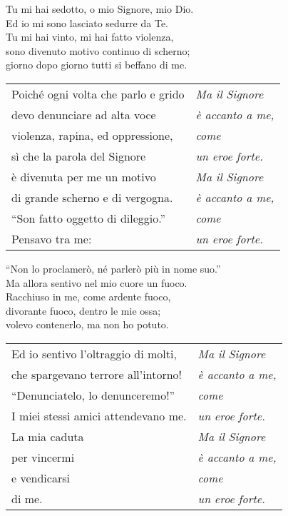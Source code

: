 
Tu mi hai sedotto, o mio Signore, mio Dio.\\
Ed io mi sono lasciato sedurre da Te.\\
Tu mi hai vinto, mi hai fatto violenza,\\
sono divenuto motivo continuo di scherno;\\
giorno dopo giorno tutti si beffano di me.

\spazio

\begin{tabular}{@{} p{6.25cm} p{4.25cm}}
  Poiché ogni volta che parlo e grido & \emph{Ma il Signore}\\
  devo denunciare ad alta voce & \emph{è accanto a me,} \\
  violenza, rapina, ed oppressione, & \emph{come} \\
  sì che la parola del Signore & \emph{un eroe forte.} \\
  è divenuta per me un motivo & \emph{Ma il Signore} \\
  di grande scherno e di vergogna. & \emph{è accanto a me,} \\
  ``Son fatto oggetto di dileggio.'' & \emph{come} \\
  Pensavo tra me: & \emph{un eroe forte.}
\end{tabular}

\spazio

``Non lo proclamerò, né parlerò più in nome suo.''\\
Ma allora sentivo nel mio cuore un fuoco.\\
Racchiuso in me, come ardente fuoco,\\
divorante fuoco, dentro le mie ossa;\\
volevo contenerlo, ma non ho potuto.

\spazio

\begin{tabular}{@{} p{6.25cm} p{4.25cm}}
  Ed io sentivo l'oltraggio di molti, & \emph{Ma il Signore}\\
  che spargevano terrore all'intorno! & \emph{è accanto a me,}\\
  ``Denunciatelo, lo denunceremo!'' & \emph{come} \\
  I miei stessi amici attendevano me. & \emph{un eroe forte.}\\
  La mia caduta & \emph{Ma il Signore} \\
  per vincermi & \emph{è accanto a me,} \\
  e vendicarsi & \emph{come} \\
  di me. & \emph{un eroe forte.}
\end{tabular}

